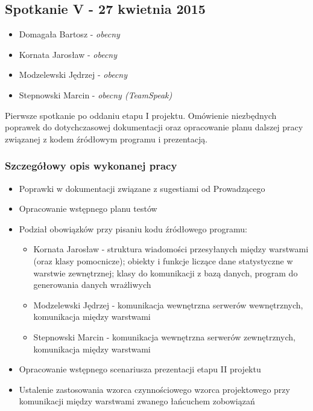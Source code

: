 \subsection[Spotkanie V - 27 kwietnia 2015]{Spotkanie V - 27 kwietnia 2015}

\begin{itemize}
\item Domagała Bartosz - \textit{obecny}
\item Kornata Jarosław - \textit{obecny}
\item Modzelewski Jędrzej - \textit{obecny}
\item Stepnowski Marcin - \textit{obecny (TeamSpeak)}
\end{itemize}

\par{Pierwsze spotkanie po oddaniu etapu I projektu. Omówienie niezbędnych poprawek do dotychczasowej dokumentacji oraz opracowanie planu dalszej pracy związanej z kodem źródłowym programu i prezentacją.} 

\subsubsection*[Szczegółowy opis wykonanej pracy]{Szczegółowy opis wykonanej pracy}
\begin{itemize}
\item Poprawki w dokumentacji związane z sugestiami od Prowadzącego
\item Opracowanie wstępnego planu testów
\item Podział obowiązków przy pisaniu kodu źródłowego programu:
\begin{itemize}
\item Kornata Jarosław - struktura wiadomości przesyłanych między warstwami (oraz klasy pomocnicze); obiekty i funkcje liczące dane statystyczne w warstwie zewnętrznej; klasy do komunikacji z bazą danych, program do generowania danych wrażliwych
\item Modzelewski Jędrzej - komunikacja wewnętrzna serwerów wewnętrznych, komunikacja między warstwami
\item Stepnowski Marcin - komunikacja wewnętrzna serwerów zewnętrznych, komunikacja między warstwami
\end{itemize}
\item Opracowanie wstępnego scenariusza prezentacji etapu II projektu
\item Ustalenie zastosowania wzorca czynnościowego wzorca projektowego przy komunikacji między warstwami zwanego łańcuchem zobowiązań
\end{itemize}

